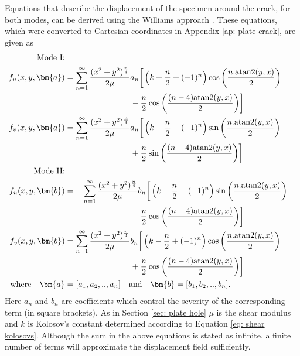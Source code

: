 \documentclass[12pt,oneside,openany,a4paper, %
english, %
masters-t, goldenblock]{usthesis}
\newcommand{\RomanNumeralCaps}[1]
    {\MakeUppercase{\romannumeral #1}}
\begin{document}
Equations that describe the displacement of the specimen around the crack, for both modes, can be derived using the Williams approach \cite{williams1997stress}. These equations, which were converted to Cartesian coordinates in Appendix \ref{ap: plate crack}, are given as 
\begin{align}
  \text{Mode \RomanNumeralCaps{1}:} \nonumber \\
  f_u(x,y,\bm{a}) &= \sum_{n=1}^{\infty} \frac{(x^2+y^2)^\frac{n}{4}}{2 \mu} a_n \bigg[ \left( k+\frac{n}{2} + (-1)^n \right) \cos{\left( \frac{n .\text{atan2} (y,x)}{2}\right)} \nonumber \\
  & \qquad \qquad \qquad \qquad - \frac{n}{2} \cos{\left( \frac{(n-4)\text{atan2} (y,x)}{2} \right)} \bigg] \\
  f_v(x,y,\bm{a}) &= \sum_{n=1}^{\infty} \frac{(x^2+y^2)^\frac{n}{4}}{2 \mu} a_n \bigg[ \left( k-\frac{n}{2} - (-1)^n \right) \sin{\left( \frac{n .\text{atan2} (y,x)}{2} \right) } \nonumber \\
  & \qquad \qquad \qquad \qquad + \frac{n}{2} \sin{ \left( \frac{(n-4)\text{atan2} (y,x)}{2} \right) } \bigg]\\
  \text{Mode \RomanNumeralCaps{2}:} \nonumber \\
  f_u(x,y,\bm{b}) &= -\sum_{n=1}^{\infty} \frac{(x^2+y^2)^\frac{n}{4}}{2 \mu} b_n \bigg[ \left( k+\frac{n}{2} - (-1)^n \right) \sin{ \left( \frac{n .\text{atan2} (y,x)}{2} \right) } \nonumber \\
  & \qquad \qquad \qquad \qquad - \frac{n}{2} \cos{ \left( \frac{(n-4)\text{atan2} (y,x)}{2} \right) } \bigg] \\
  f_v(x,y,\bm{b}) &= \sum_{n=1}^{\infty} \frac{(x^2+y^2)^\frac{n}{4}}{2 \mu} b_n \bigg[ \left( k-\frac{n}{2} + (-1)^n \right) \cos{ \left( \frac{n .\text{atan2} (y,x)}{2} \right) } \nonumber \\
  & \qquad \qquad \qquad \qquad + \frac{n}{2} \cos{ \left( \frac{(n-4)\text{atan2} (y,x)}{2} \right) } \bigg] \\
  \text{where} \quad \bm{a}&=[a_1, a_2, .., a_n] \quad \text{and} \quad \bm{b}=[b_1, b_2, .., b_n].
\end{align}
Here $a_n$ and $b_n$ are coefficients which control the severity of the corresponding term (in square brackets). As in Section \ref{sec: plate hole} $\mu$ is the shear modulus and $k$ is Kolosov's constant determined according to Equation \ref{eq: shear kolosovs}. Although the sum in the above equations is stated as infinite, a finite number of terms will approximate the displacement field sufficiently. 
\end{document}

